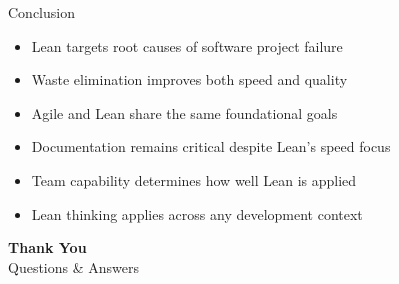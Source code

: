 \documentclass{thapathali}
\begin{document}
\begin{frame}{Conclusion}
    \begin{itemize}
        \item Lean targets root causes of software project failure
        \item Waste elimination improves both speed and quality
        \item Agile and Lean share the same foundational goals
        \item Documentation remains critical despite Lean's speed focus
        \item Team capability determines how well Lean is applied
        \item Lean thinking applies across any development context
    \end{itemize}
\end{frame}

\begin{frame}[plain]
    \begin{center}
        \vspace{1.5cm}
        {\huge \bfseries Thank You} \\[1em]
        {\large Questions \& Answers}
    \end{center}
\end{frame}
\end{document}
